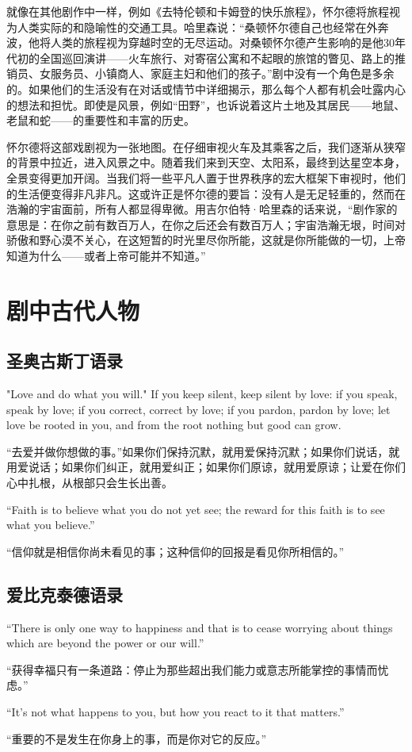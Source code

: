 \documentclass[lang=cn,newtx,12pt,scheme=chinese]{elegantbook}
\begin{document}
就像在其他剧作中一样，例如《去特伦顿和卡姆登的快乐旅程》，怀尔德将旅程视为人类实际的和隐喻性的交通工具。哈里森说：“桑顿怀尔德自己也经常在外奔波，他将人类的旅程视为穿越时空的无尽运动。对桑顿怀尔德产生影响的是他30年代初的全国巡回演讲——火车旅行、对寄宿公寓和不起眼的旅馆的瞥见、路上的推销员、女服务员、小镇商人、家庭主妇和他们的孩子。”剧中没有一个角色是多余的。如果他们的生活没有在对话或情节中详细揭示，那么每个人都有机会吐露内心的想法和担忧。即使是风景，例如“田野”，也诉说着这片土地及其居民——地鼠、老鼠和蛇——的重要性和丰富的历史。

怀尔德将这部戏剧视为一张地图。在仔细审视火车及其乘客之后，我们逐渐从狭窄的背景中拉近，进入风景之中。随着我们来到天空、太阳系，最终到达星空本身，全景变得更加开阔。当我们将一些平凡人置于世界秩序的宏大框架下审视时，他们的生活便变得非凡非凡。这或许正是怀尔德的要旨：没有人是无足轻重的，然而在浩瀚的宇宙面前，所有人都显得卑微。用吉尔伯特·哈里森的话来说，“剧作家的意思是：在你之前有数百万人，在你之后还会有数百万人；宇宙浩瀚无垠，时间对骄傲和野心漠不关心，在这短暂的时光里尽你所能，这就是你所能做的一切，上帝知道为什么——或者上帝可能并不知道。”

\chapter{剧中古代人物}

\section{圣奥古斯丁语录}

"Love and do what you will." If you keep silent, keep silent by love: if you speak, speak by love; if you correct, correct by love; if you pardon, pardon by love; let love be rooted in you, and from the root nothing but good can grow.

“去爱并做你想做的事。”如果你们保持沉默，就用爱保持沉默；如果你们说话，就用爱说话；如果你们纠正，就用爱纠正；如果你们原谅，就用爱原谅；让爱在你们心中扎根，从根部只会生长出善。

“Faith is to believe what you do not yet see; the reward for this faith is to see what you believe.”

“信仰就是相信你尚未看见的事；这种信仰的回报是看见你所相信的。”

\section{爱比克泰德语录}

“There is only one way to happiness and that is to cease worrying about things which are beyond the power or our will.”

“获得幸福只有一条道路：停止为那些超出我们能力或意志所能掌控的事情而忧虑。”

“It's not what happens to you, but how you react to it that matters.”

“重要的不是发生在你身上的事，而是你对它的反应。”
\end{document}
